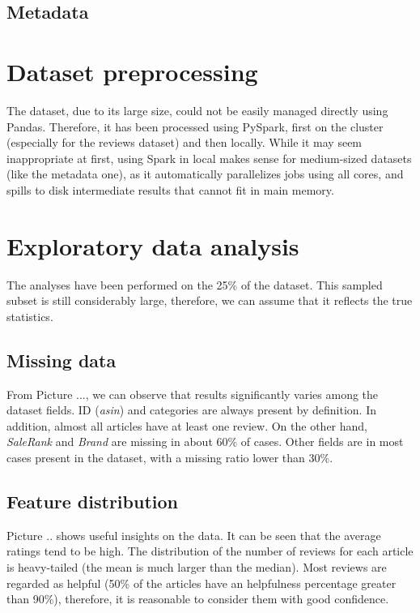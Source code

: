 \documentclass[11pt]{article}
\begin{document}
\subsection{Metadata}

\section{Dataset preprocessing}
The dataset, due to its large size, could not be easily managed directly using Pandas. Therefore, it has been processed using PySpark, first on the cluster (especially for the reviews dataset) and then locally. While it may seem inappropriate at first, using Spark in local makes sense for medium-sized datasets (like the metadata one), as it automatically parallelizes jobs using all cores, and spills to disk intermediate results that cannot fit in main memory.

\section{Exploratory data analysis}
The analyses have been performed on the 25\% of the  dataset. This sampled subset is still considerably large, therefore, we can assume that it reflects the true statistics.
\subsection{Missing data}
From Picture ..., we can observe that results significantly varies among the dataset fields. ID (\textit{asin}) and categories are always present by definition. In addition, almost all articles have at least one review. On the other hand, \textit{SaleRank} and \textit{Brand} are missing in about 60\% of cases. Other fields are in most cases present in the dataset, with a missing ratio lower than 30\%.
\subsection{Feature distribution}
Picture .. shows useful insights on the data.  It can be seen that the average ratings tend to be high. The distribution of the number of reviews for each article is heavy-tailed (the mean is much larger than the median). Most reviews are regarded as helpful (50\% of the articles have an helpfulness percentage greater than 90\%), therefore, it is reasonable to consider them with good confidence.
\end{document}
